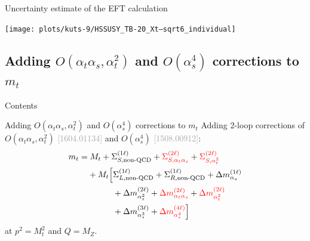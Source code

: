 \documentclass[hyperref={pdfpagelabels=false},ngerman]{beamer}
\newcommand{\bigcite}[1]{\textcolor{darkgray}{[#1]}}
\newcommand{\at}{\alpha_t}
\newcommand{\as}{\alpha_s}
\newcommand{\Loop}{\ensuremath{\ell}\xspace}
\begin{document}
\begin{frame}{Uncertainty estimate of the EFT calculation}
  \begin{center}
    \texttt{[image: plots/kuts-9/HSSUSY\_TB-20\_Xt--sqrt6\_individual]}
  \end{center}
\end{frame}

\subsection{Adding $O(\at\as, \at^2)$ and $O(\as^4)$ corrections to $m_t$}

\begin{frame}{Contents}
\end{frame}

\begin{frame}{Adding $O(\at\as, \at^2)$ and $O(\as^4)$ corrections to $m_t$}
  Adding 2-loop corrections of $O(\at\as, \at^2)$ \bigcite{1604.01134}
  and $O(\as^4)$ \bigcite{1508.00912}:
\begin{align*}
  m_t &= M_t
  + \Sigma_{S,\text{non-QCD}}^{(1\Loop)}
  + \textcolor{red}{\Sigma_{S,\at\as}^{(2\Loop)}}
  + \textcolor{red}{\Sigma_{S,\at^2}^{(2\Loop)}} \\
  &\phantom{={}} + M_t \Big[ \Sigma_{L,\text{non-QCD}}^{(1\Loop)} + \Sigma_{R,\text{non-QCD}}^{(1\Loop)}
    + \Delta m_{\as}^{(1\Loop)} \\
  &\phantom{={} + M_t \Big[}
    + \Delta m_{\as^2}^{(2\Loop)}
    + \textcolor{red}{\Delta m_{\at\as}^{(2\Loop)}}
    + \textcolor{red}{\Delta m_{\at^2}^{(2\Loop)}} \\
  &\phantom{={} + M_t \Big[}
    + \Delta m_{\as^3}^{(3\Loop)}
    + \textcolor{red}{\Delta m_{\as^4}^{(4\Loop)}}
  \Big]
\end{align*}
at $p^2 = M_t^2$ and  $Q = M_Z$.
\end{frame}
\end{document}
